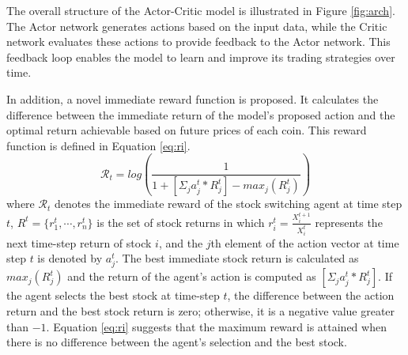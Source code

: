 The overall structure of the Actor-Critic model is illustrated in Figure \ref{fig:arch}. The Actor network generates actions based on the input data, while the Critic network evaluates these actions to provide feedback to the Actor network. This feedback loop enables the model to learn and improve its trading strategies over time.


In addition, a novel immediate reward function is proposed. It calculates the difference between the immediate return of the model's proposed action and the optimal return achievable based on future prices of each coin. This reward function is defined in Equation \eqref{eq:ri}.
\begin{equation}
	\mathcal{R}_t = log(\frac{1}{1 + [\Sigma_{j} a_j^t * R_j^t] - max_j(R_j^t)})
	\label{eq:ri}
\end{equation}
where $\mathcal{R}_t$ denotes the immediate reward of the stock switching agent at time step $t$, $R^t = \{r_1^t, \cdots, r_n^t\}$ is the set of stock returns in which $r_i^t = \frac{X_i^{t+1}}{X_i^t}$ represents the next time-step return of stock $i$, and the $j$th element of the action vector at time step $t$ is denoted by $a_j^t$. The best immediate stock return is calculated as $max_j(R_j^t)$ and the return of the agent's action is computed as $ [\Sigma_{j} a_j^t * R_j^t]$. If the agent selects the best stock at time-step $t$, the difference between the action return and the best stock return is zero; otherwise, it is a negative value greater than $-1$. Equation \eqref{eq:ri} suggests that the maximum reward is attained when there is no difference between the agent's selection and the best stock.